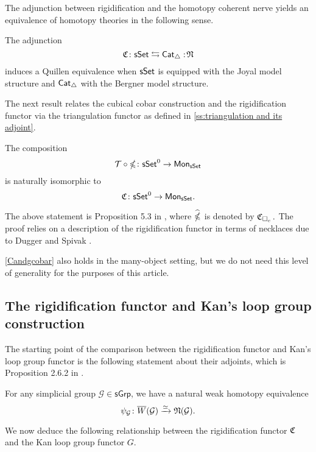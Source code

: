 The adjunction between rigidification and the homotopy coherent nerve yields an equivalence of homotopy theories in the following sense.

\begin{proposition} \label{joyalbergner}
	The adjunction
	$$\operatorname{\mathfrak{C}} \colon \mathsf{sSet} \leftrightarrows \mathsf{Cat}_{\triangle} :\!\operatorname{\mathfrak{N}}$$
	induces a Quillen equivalence when $\mathsf{sSet}$ is equipped with the Joyal model structure and $\mathsf{Cat}_{\triangle}$ with the Bergner model structure.
\end{proposition}

The next result relates the cubical cobar construction and the rigidification functor via the triangulation functor as defined in  \cref{ss:triangulation and its adjoint}.

\begin{proposition} \label{Candgcobar}
	The composition 
	$$\mathcal{T} \circ \operatorname{\mathbb{\Omega}} \colon \mathsf{sSet}^0 \to \mathsf{Mon}_{\mathsf{sSet}}$$
	is naturally isomorphic to
	$$\operatorname{\mathfrak{C}} \colon \mathsf{sSet}^0 \to \mathsf{Mon}_{\mathsf{sSet}}.$$
\end{proposition}

The above statement is Proposition 5.3 in \cite{rivera2018cubical}, where $\widehat{\operatorname{\mathbb{\Omega}}}$ is denoted by $\operatorname{\mathfrak{C}}_{\square_c}.$ The proof relies on a description of the rigidification functor in terms of necklaces due to Dugger and Spivak \cite{dugger2011rigidification}.

\cref{Candgcobar} also holds in the many-object setting, but we do not need this level of generality for the purposes of this article.

\subsection{The rigidification functor and Kan's loop group construction}

The starting point of the comparison between the rigidification functor and Kan's loop group functor is the following statement about their adjoints, which is Proposition 2.6.2 in \cite{hinich2007deformation}.

\begin{proposition} \label{hinich}
	For any simplicial group $\mathcal{G} \in \mathsf{sGrp}$, we have a natural weak homotopy equivalence
	$$\psi_{\mathcal{G}} \colon \overline{W}(\mathcal{G}) \xrightarrow{\simeq} \operatorname{\mathfrak{N}}(\mathcal{G}).$$
\end{proposition} 

We now deduce the following relationship between the rigidification functor $\operatorname{\mathfrak{C}}$ and the Kan loop group functor $G$.

